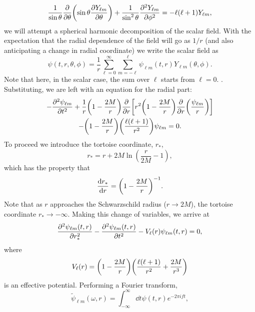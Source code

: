 \begin{equation}
    \frac{1}{\sin{\theta}} \pdv{\theta} \qty(\sin{\theta} \pdv{Y_{\ell m}}{\theta} ) + \frac{1}{\sin^2{\theta}} \pdv[2]{Y_{\ell m}}{\phi} = - \ell (\ell + 1) Y_{\ell m},
\end{equation}
we will attempt a spherical harmonic decomposition of the scalar field. 
With the expectation that the radial dependence of the field will go as $1/r$ (and also anticipating a change in radial coordinate) we write the scalar field as
\begin{equation}
    \psi(t, r, \theta, \phi) = \frac{1}{r} \sum_{\ell = 0}^\infty \sum_{m = -\ell}^\ell \psi_{\ell m}(t, r) Y_{\ell m}(\theta, \phi).
\end{equation}
Note that here, in the scalar case, the sum over $\ell$ starts from $\ell = 0$.
.
Substituting, we are left with an equation for the radial part:
\begin{multline}
    - \pdv[2]{\psi_{\ell m}}{t} + \frac{1}{r} \qty(1 - \frac{2M}{r}) \pdv{r} \qty[r^2 \qty(1 - \frac{2M}{r}) \pdv{r}\qty(\frac{\psi_{\ell m}}{r}) ]\\
    - \qty(1 - \frac{2M}{r}) \qty(\frac{\ell (\ell + 1)}{r^2}) \psi_{\ell m} = 0.
\end{multline}
To proceed we introduce the tortoise coordinate, $r_*$,
\begin{equation}
    r_* = r + 2M \ln(\frac{r}{2M} - 1),
\end{equation}
which has the property that
\begin{equation}
    \dv{r_*}{r} = \qty( 1 - \frac{2M}{r} )^{-1}.
\end{equation}
Note that as $r$ approaches the Schwarzschild radius ($r \rightarrow 2M$), the tortoise coordinate $r_* \rightarrow -\infty$.
Making this change of variables, we arrive at
\begin{equation}\label{ch1:eq:wave_equation}
    \pdv[2]{\psi_{\ell m}(t,r)}{r_*} - \pdv[2]{\psi_{\ell m}(t,r)}{t} - V_\ell(r) \psi_{\ell m}(t,r) = 0,
\end{equation}
where
\begin{equation}
    V_\ell(r) = \qty( 1 - \frac{2M}{r} ) \qty( \frac{\ell (\ell + 1)}{r^2} + \frac{2M}{r^3} )
\end{equation}
is an effective potential.
Performing a Fourier transform, 
\begin{equation}\label{ch1:eq:ft}
    \tilde{\psi}_{\ell m}(\omega,r) = \int_{-\infty}^\infty \dd{t} \psi(t,r) e^{-2\pi i f t},
\end{equation}
